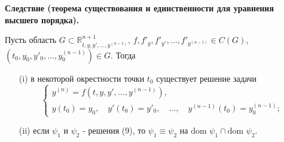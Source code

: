 \textbf{Следствие (теорема существования и единственности для уравнения высшего порядка).} 

Пусть область $G \subset \mathbb{R}_{t,y, y', \dots, y^{(n-1)}}^{n+1}$, $f, f'_y, f'_{y'}, \dots, f'_{y^{(n-1)}} \in C(G)$, $(t_0, y_0, y'_0, \dots, y_0^{(n-1)}) \in G$. Тогда
\begin{enumerate}
    \item[(i)] в некоторой окрестности точки $t_0$ существует решение задачи
    $$
    \begin{cases}
        y^{(n)} = f(t, y, y', \dots, y^{(n-1)}), \\
        y(t_0) = y_0, \quad y'(t_0) = y'_0, \quad \dots, \quad y^{(n-1)}(t_0) = y_0^{(n-1)};
    \end{cases}
    $$
    \item[(ii)] если $\psi_1$ и $\psi_2$ - решения (9), то $\psi_1 \equiv \psi_2$ на $\text{dom } \psi_1 \cap \text{dom } \psi_2$.
\end{enumerate}